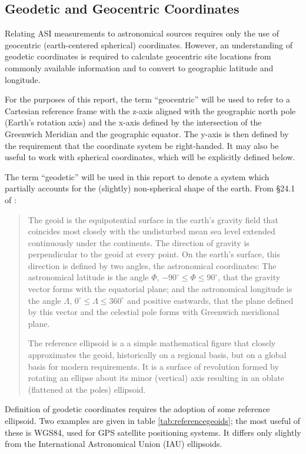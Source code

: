 \documentclass[11pt,twoside]{article}   %
\begin{document}
\subsection{Geodetic and Geocentric Coordinates}
%
Relating ASI measurements to astronomical sources requires only
the use of geocentric (earth-centered spherical) coordinates.
However, an understanding of geodetic coordinates is required to
calculate geocentric site locations from commonly available
information and to convert to geographic latitude and longitude.

For the purposes of this report, the term ``geocentric'' will be
used to refer to a Cartesian reference frame with the z-axis
aligned with the geographic north pole (Earth's rotation axis) and
the x-axis defined by the intersection of the Greenwich Meridian
and the geographic equator.  The y-axis is then defined by the
requirement that the coordinate system be right-handed.  It may
also be useful to work with spherical coordinates, which will be
explicitly defined below.

The term ``geodetic'' will be used in this report to denote a
system which partially accounts for the (slightly) non-spherical
shape of the earth. From \S 24.1 of
\cite{geospace_handbook_geodesy}:
\begin{quotation}
The geoid is the equipotential surface in the earth's gravity
field that coincides most closely with the undisturbed mean sea
level extended continuously under the continents.  The direction
of gravity is perpendicular to the geoid at every point.  On the
earth's surface, this direction is defined by two angles, the
astronomical coordinates: The astronomical latitude is the angle
$\Phi$, $-90^\circ \le \Phi \le 90^\circ$, that the gravity vector
forms with the equatorial plane; and the astronomical longitude is
the angle $\Lambda$, $0^\circ \le \Lambda \le 360^\circ$ and
positive eastwards, that the plane defined by this vector and the
celestial pole forms with Greenwich meridional plane.

The reference ellipsoid is a a simple mathematical figure that
closely approximates the geoid, historically on a regional basis,
but on a global basis for modern requirements.  It is a surface of
revolution formed by rotating an ellipse about its minor
(vertical) axis resulting in an oblate (flattened at the poles)
ellipsoid.
\end{quotation}

Definition of geodetic coordinates requires the adoption of some
reference ellipsoid.  Two examples are given in table
\ref{tab:referencegeoids}; the most useful of these is WGS84, used
for GPS satellite positioning systems.  It differs only slightly
from the International Astronomical Union (IAU) ellipsoids.
\end{document}
